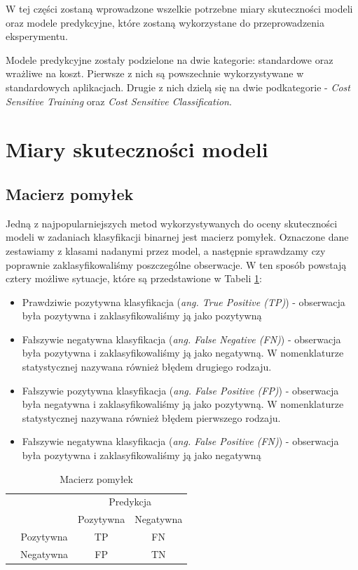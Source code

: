 \documentclass{book}
\begin{document}
W tej części zostaną wprowadzone wszelkie potrzebne miary skuteczności modeli oraz modele predykcyjne, które zostaną wykorzystane do przeprowadzenia eksperymentu. 

Modele predykcyjne zostały podzielone na dwie kategorie: standardowe oraz wrażliwe na koszt. Pierwsze z nich są powszechnie wykorzystywane w standardowych aplikacjach. Drugie z nich dzielą się na dwie podkategorie - \textit{Cost Sensitive Training} oraz \textit{Cost Sensitive Classification}.

\section{Miary skuteczności modeli}


\subsection{Macierz pomyłek}

Jedną z najpopularniejszych metod wykorzystywanych do oceny skuteczności modeli w zadaniach klasyfikacji binarnej jest macierz pomyłek. Oznaczone dane zestawiamy z klasami nadanymi przez model, a następnie sprawdzamy czy poprawnie zaklasyfikowaliśmy poszczególne obserwacje. W ten sposób powstają cztery możliwe sytuacje, które są przedstawione w Tabeli \ref{macierz-pomylek}: 
\begin{itemize}
	\item Prawdziwie pozytywna klasyfikacja (\textit{ang. True Positive (TP)}) - obserwacja była pozytywna i zaklasyfikowaliśmy ją jako pozytywną
	\item Fałszywie negatywna klasyfikacja (\textit{ang. False Negative (FN)}) - obserwacja była pozytywna i zaklasyfikowaliśmy ją jako negatywną. W nomenklaturze statystycznej nazywana również błędem drugiego rodzaju.
	\item Fałszywie pozytywna klasyfikacja (\textit{ang. False Positive (FP)}) - obserwacja była negatywna i zaklasyfikowaliśmy ją jako pozytywną. W nomenklaturze statystycznej nazywana również błędem pierwszego rodzaju.
	\item Fałszywie negatywna klasyfikacja (\textit{ang. False Positive (FN)}) - obserwacja była pozytywna i zaklasyfikowaliśmy ją jako negatywną
\end{itemize}
\begin{table}[h]
	\begin{center}
		\makegapedcells
		\begin{tabular}{cc|cc}
			\multicolumn{2}{c}{}     &   \multicolumn{2}{c}{Predykcja} \\
			&            &   Pozytywna &   Negatywna     \\ 
			\cline{2-4}
			\multirow{2}{*}{\rotatebox[origin=c]{90}{Prawda}} & Pozytywna   & TP         & FN              \\
			& Negatywna   & FP         & TN              \\ 
			\cline{2-4}
		\end{tabular}
	\end{center}
	\caption{Macierz pomyłek}
	\label{macierz-pomylek}
\end{table}
\end{document}
